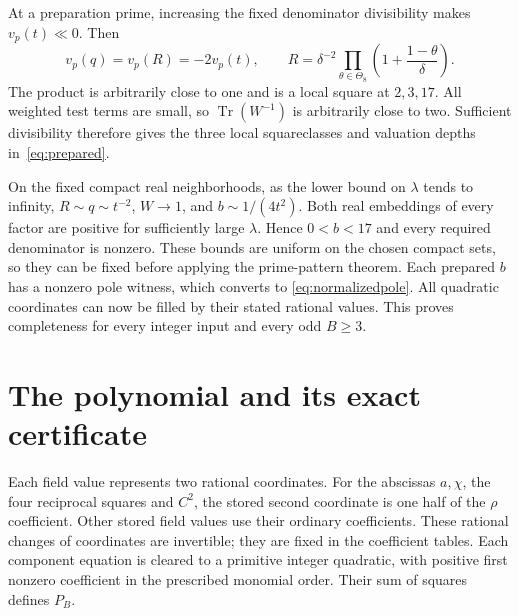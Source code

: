 \documentclass[11pt,a4paper]{article}
\DeclareMathOperator{\Tr}{Tr}\DeclareMathOperator{\Nm}{N}
\begin{document}
At a preparation prime, increasing the fixed denominator divisibility
makes $v_p(t)\ll0$. Then
\[
 v_p(q)=v_p(R)=-2v_p(t),\qquad
 R=\delta^{-2}\prod_{\theta\in\Theta_8}
                   \left(1+\frac{1-\theta}{\delta}\right).
\]
The product is arbitrarily close to one and is a local square at
$2,3,17$. All weighted test terms are small, so $\Tr(W^{-1})$ is
arbitrarily close to two. Sufficient divisibility therefore gives the
three local squareclasses and valuation depths in~\eqref{eq:prepared}.

On the fixed compact real neighborhoods, as the lower bound on $\lambda$
tends to infinity, $R\sim q\sim t^{-2}$, $W\to1$, and
$b\sim1/(4t^2)$. Both real embeddings of every factor are positive
for sufficiently large $\lambda$. Hence $0<b<17$ and every required
denominator is nonzero. These bounds are uniform on the chosen compact
sets, so they can be fixed before applying the prime-pattern theorem.
Each prepared $b$ has a nonzero pole witness, which converts to
\eqref{eq:normalizedpole}. All quadratic coordinates can now be filled
by their stated rational values. This proves completeness for every
integer input and every odd $B\ge3$.

\section{The polynomial and its exact certificate}

Each field value represents two rational coordinates. For the abscissas
$a,\chi$, the four reciprocal squares and $C^2$, the stored second
coordinate is one half of the $\rho$ coefficient. Other stored field
values use their ordinary coefficients. These rational changes of
coordinates are invertible; they are fixed in the coefficient tables.
Each component equation is cleared to a primitive integer quadratic,
with positive first nonzero coefficient in the prescribed monomial order.
Their sum of squares defines $P_B$.
\end{document}
